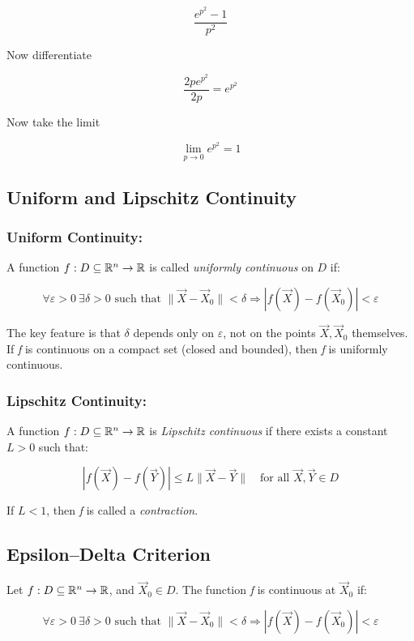 \[
    \frac{e^{p^2} - 1}{p^2}
\]

Now differentiate

\[
    \frac{2p e^{p^2} }{2p} = e^{p^2}
\]

Now take the limit

\[
    \lim_{p \to 0} e^{p^2} = 1
\]

\subsection{Uniform and Lipschitz Continuity}

\subsubsection{Uniform Continuity:}  
A function \( f : D \subseteq \mathbb{R}^n \to \mathbb{R} \) is called \emph{uniformly continuous} on 
\( D \) if:

\[
    \forall \varepsilon > 0 \ \exists \delta > 0 \text{ such that } \|\vec{X} - \vec{X}_0\| < \delta 
    \Rightarrow |f(\vec{X}) - f(\vec{X}_0)| < \varepsilon
\]

The key feature is that \( \delta \) depends only on \( \varepsilon \), not on the points 
\( \vec{X}, \vec{X}_0 \) themselves.  
If \emph{f} is continuous on a compact set (closed and bounded), then \emph{f} is uniformly continuous.

\subsubsection{Lipschitz Continuity:}  

A function \( f : D \subseteq \mathbb{R}^n \to \mathbb{R} \) is \emph{Lipschitz continuous} if there 
exists a constant \( L > 0 \) such that:

\[
    |f(\vec{X}) - f(\vec{Y})| \le L \|\vec{X} - \vec{Y}\| \quad \text{for all } \vec{X}, \vec{Y} \in D
\]

If \( L < 1 \), then \emph{f} is called a \emph{contraction}.

\subsection{Epsilon–Delta Criterion}

Let \( f : D \subseteq \mathbb{R}^n \to \mathbb{R} \), and \( \vec{X}_0 \in D \). The function 
\emph{f} is continuous at \( \vec{X}_0 \) if:

\[
    \forall \varepsilon > 0 \ \exists \delta > 0 \text{ such that } \|\vec{X} - \vec{X}_0\| 
    < \delta \Rightarrow |f(\vec{X}) - f(\vec{X}_0)| < \varepsilon
\]

